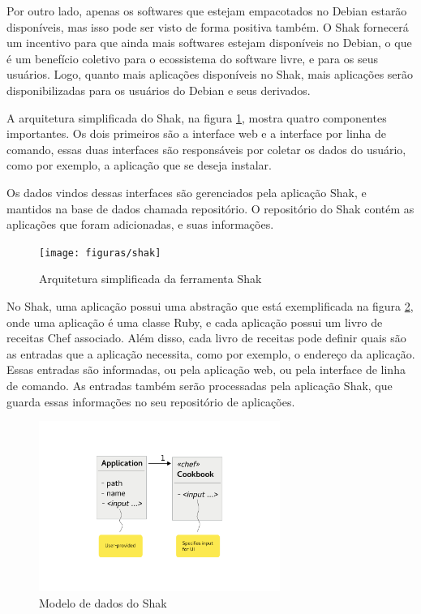 Por outro lado, apenas os softwares que estejam empacotados no Debian estarão
disponíveis, mas isso pode ser visto de forma positiva também. O Shak
fornecerá um incentivo para que ainda mais softwares estejam disponíveis no
Debian, o que é um benefício coletivo para o ecossistema do software livre, e
para os seus usuários. Logo, quanto mais aplicações disponíveis no Shak,
mais aplicações serão disponibilizadas para os usuários do Debian e seus derivados.

A arquitetura simplificada do Shak, na figura \ref{fig:shak}, mostra quatro
componentes importantes. Os dois primeiros são a interface web e a interface
por linha de comando, essas duas interfaces são responsáveis por coletar os
dados do usuário, como por exemplo, a aplicação que se deseja instalar.

Os dados vindos dessas interfaces são gerenciados pela aplicação Shak, e mantidos
na base de dados chamada repositório. O repositório do Shak contém as aplicações
que foram adicionadas, e suas informações.

\begin{figure}[h]
  \centering
  \texttt{[image: figuras/shak]}
      \caption{Arquitetura simplificada da ferramenta Shak}
  \label{fig:shak}
\end{figure}

No Shak, uma aplicação possui uma abstração que está exemplificada na figura \ref{fig:shak2},
onde uma aplicação é uma classe Ruby, e cada aplicação possui um livro de receitas
Chef associado. Além disso, cada livro de receitas pode definir quais são as entradas que
a aplicação necessita, como por exemplo, o endereço da aplicação. Essas entradas
são informadas, ou pela aplicação web, ou pela interface de linha de comando. As entradas 
também serão processadas pela aplicação Shak, que guarda essas informações no
seu repositório de aplicações. 

\begin{figure}[h]
  \centering
  \includegraphics[width=0.7\textwidth]
      {figuras/data-model}
      \caption{Modelo de dados do Shak}
  \label{fig:shak2}
\end{figure}


